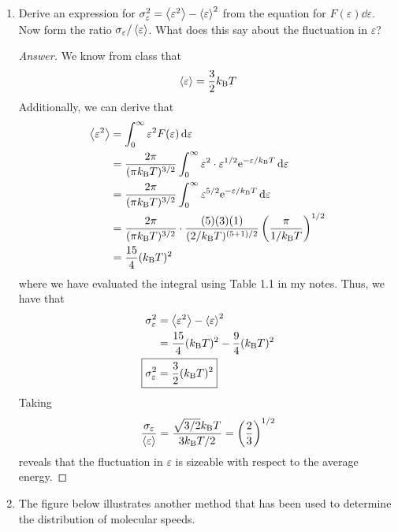\documentclass[../psets.tex]{subfiles}
\begin{document}
\begin{enumerate}[label={\textbf{27-\arabic*.}},leftmargin=3.5em]
    \item Derive an expression for $\sigma_\varepsilon^2=\prb{\varepsilon^2}-\prb{\varepsilon}^2$ from the equation for $F(\varepsilon)\dd{\varepsilon}$. Now form the ratio $\sigma_\varepsilon/\prb{\varepsilon}$. What does this say about the fluctuation in $\varepsilon$?
    \begin{proof}[Answer]
        We know from class that
        \begin{equation*}
            \prb{\varepsilon} = \frac{3}{2}\kB T
        \end{equation*}
        Additionally, we can derive that
        \begin{align*}
            \prb{\varepsilon^2} &= \int_0^\infty\varepsilon^2F(\varepsilon)\dd{\varepsilon}\\
            &= \frac{2\pi}{(\pi\kB T)^{3/2}}\int_0^\infty\varepsilon^2\cdot\varepsilon^{1/2}\e[-\varepsilon/\kB T]\dd{\varepsilon}\\
            &= \frac{2\pi}{(\pi\kB T)^{3/2}}\int_0^\infty\varepsilon^{5/2}\e[-\varepsilon/\kB T]\dd{\varepsilon}\\
            &= \frac{2\pi}{(\pi\kB T)^{3/2}}\cdot\frac{(5)(3)(1)}{(2/\kB T)^{(5+1)/2}}\left( \frac{\pi}{1/\kB T} \right)^{1/2}\\
            &= \frac{15}{4}(\kB T)^2
        \end{align*}
        where we have evaluated the integral using Table 1.1 in my notes. Thus, we have that
        \begin{align*}
            \sigma_\varepsilon^2 &= \prb{\varepsilon^2}-\prb{\varepsilon}^2\\
            &= \frac{15}{4}(\kB T)^2-\frac{9}{4}(\kB T)^2\\
            \Aboxed{\sigma_\varepsilon^2 &= \frac{3}{2}(\kB T)^2}
        \end{align*}
        Taking
        \begin{equation*}
            \frac{\sigma_\varepsilon}{\prb{\varepsilon}} = \frac{\sqrt{3/2}\kB T}{3\kB T/2}
            = \left( \frac{2}{3} \right)^{1/2}
        \end{equation*}
        reveals that the fluctuation in $\varepsilon$ is sizeable with respect to the average energy.
    \end{proof}
    \setcounter{enumi}{33}
    \item The figure below illustrates another method that has been used to determine the distribution of molecular speeds.
    \begin{figure}[H]
        \centering
        \footnotesize
        \begin{subfigure}[b]{0.49\linewidth}
            \centering
\end{subfigure}
\end{figure}
\end{enumerate}
\end{document}
